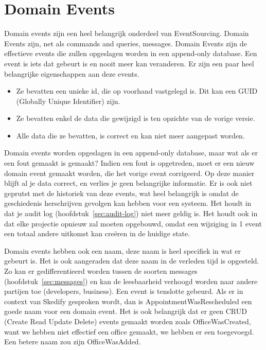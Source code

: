 
\section{Domain Events}
\label{sec:domain-events}

Domain events zijn een heel belangrijk onderdeel van EventSourcing. Domain Events zijn, net als commands and queries, messages. Domain Events zijn de effectieve events die zullen opgeslagen worden in een append-only database. Een event is iets dat gebeurt is en nooit meer kan veranderen. Er zijn een paar heel belangrijke eigenschappen aan deze events.

\begin{itemize}
  \item{Ze bevatten een unieke id, die op voorhand vastgelegd is. Dit kan een GUID (Globally Unique Identifier) zijn.}
  \item{Ze bevatten enkel de data die gewijzigd is ten opzichte van de vorige versie.}
  \item{Alle data die ze bevatten, is correct en kan niet meer aangepast worden.}
\end{itemize}

Domain events worden opgeslagen in een append-only database, maar wat als er een fout gemaakt is gemaakt?
Indien een fout is opgetreden, moet er een nieuw domain event gemaakt worden, die het vorige event corrigeerd. Op deze manier blijft al je data correct, en verlies je geen belangrijke informatie. Er is ook niet geprutst met de historiek van deze events, wat heel belangrijk is omdat de geschiedenis herschrijven gevolgen kan hebben voor een systeem. Het houdt in dat je audit log (hoofdstuk~\ref{sec:audit-log}) niet meer geldig is. Het houdt ook in dat elke projectie opnieuw zal moeten opgebouwd, omdat een wijziging in 1 event een totaal andere uitkomst kan creëren in de huidige state.

Domain events hebben ook een naam, deze naam is heel specifiek in wat er gebeurt is. Het is ook aangeraden dat deze naam in de verleden tijd is opgesteld. Zo kan er gedifferentieerd worden tussen de soorten messages (hoofdstuk~\ref{sec:messages}) en kan de leesbaarheid verhoogd worden naar andere partijen toe (developers, business). Een event is tenslotte gebeurd. Als er in context van Skedify gesproken wordt, dan is AppointmentWasRescheduled een goede naam voor een domain event. Het is ook belangrijk dat er geen CRUD (Create Read Update Delete) events gemaakt worden zoals OfficeWasCreated, want we hebben niet effectief een office gemaakt, we hebben er een toegevoegd. Een betere naam zou zijn OfficeWasAdded.